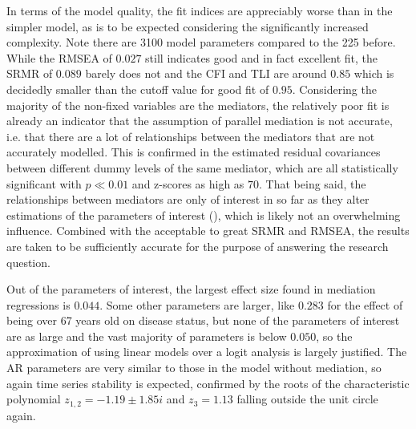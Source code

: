 In terms of the model quality, the fit indices are appreciably worse than in the simpler model, as is to be expected
considering the significantly increased complexity. Note there are 3100 model parameters compared to the 225 before.
While the RMSEA of $0.027$ still indicates good and in fact excellent fit, the SRMR of $0.089$ barely does not and the
CFI and TLI are around $0.85$ which is decidedly smaller than the cutoff value for good fit of $0.95$.
Considering the majority of the non-fixed variables are the mediators, the relatively poor fit is already an indicator
that the assumption of parallel mediation is not accurate,
i.e. that there are a lot of relationships between the mediators that are not accurately modelled.
This is confirmed in the estimated residual covariances between different dummy levels of the same mediator,
which are all statistically significant with $p \ll 0.01$ and z-scores as high as $70$.
That being said, the relationships between mediators are only of interest in so far as they alter estimations
of the parameters of interest (), which is likely not an overwhelming influence.
Combined with the acceptable to great SRMR and RMSEA, the results are taken to be sufficiently accurate for the
purpose of answering the research question.

Out of the parameters of interest, the largest effect size found in mediation regressions is $0.044$.
Some other parameters are larger, like $0.283$ for the effect of being over 67 years old on disease status,
but none of the parameters of interest are as large and the vast majority of parameters is below $0.050$,
so the approximation of using linear models over a logit analysis is largely justified.
The AR parameters are very similar to those in the model without mediation, so again time series stability is
expected, confirmed by the roots of the characteristic polynomial $z_{1, 2} = -1.19 \pm 1.85i$ and $z_3 = 1.13$
falling outside the unit circle again.

